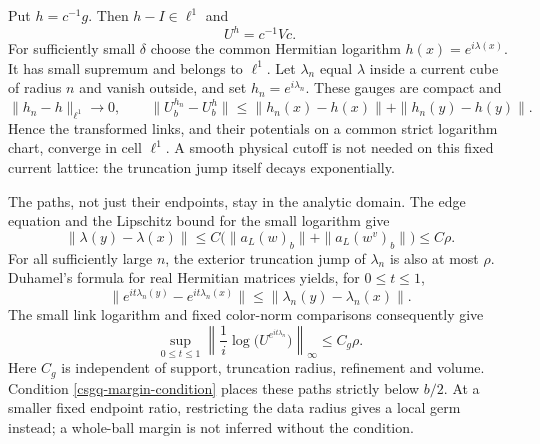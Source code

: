 Put $h=c^{-1}g$. Then $h-I\in\ell^1$ and
\begin{equation}
                         U^h=c^{-1}Vc.
 \label{csgq-normalized-gauge}
\end{equation}
For sufficiently small $\delta$ choose the common Hermitian logarithm
$h(x)=e^{i\lambda(x)}$. It has small supremum and belongs to $\ell^1$.
Let $\lambda_n$ equal $\lambda$ inside a current cube of radius $n$
and vanish outside, and set $h_n=e^{i\lambda_n}$. These gauges are
compact and
\begin{equation}
 \|h_n-h\|_{\ell^1}\longrightarrow0,\qquad
 \|U^{h_n}_b-U^h_b\|
       \le\|h_n(x)-h(x)\|+\|h_n(y)-h(y)\|.
 \label{csgq-compact-gauge-limit}
\end{equation}
Hence the transformed links, and their potentials on a common strict
logarithm chart, converge in cell $\ell^1$. A smooth physical cutoff is
not needed on this fixed current lattice: the truncation jump itself
decays exponentially.

The paths, not just their endpoints, stay in the analytic domain.
The edge equation and the Lipschitz bound for the small logarithm give
\begin{equation}
 \|\lambda(y)-\lambda(x)\|
 \le C\bigl(\|a_L(w)_b\|+\|a_L(w^v)_b\|\bigr)\le C\rho.
 \label{csgq-log-gradient}
\end{equation}
For all sufficiently large $n$, the exterior truncation jump of
$\lambda_n$ is also at most $\rho$. Duhamel's formula for real
Hermitian matrices yields, for $0\le t\le1$,
\[
 \|e^{it\lambda_n(y)}-e^{it\lambda_n(x)}\|
                  \le\|\lambda_n(y)-\lambda_n(x)\|.
\]
The small link logarithm and fixed color-norm comparisons consequently
give
\begin{equation}
 \sup_{0\le t\le1}
   \left\|\frac1i\log\bigl(U^{e^{it\lambda_n}}\bigr)\right\|_\infty
                    \le C_g\rho.
 \label{csgq-path-margin}
\end{equation}
Here $C_g$ is independent of support, truncation radius, refinement and
volume. Condition \eqref{csgq-margin-condition} places these paths
strictly below $b/2$. At a smaller fixed endpoint ratio, restricting
the data radius gives a local germ instead; a whole-ball margin is
not inferred without the condition.

